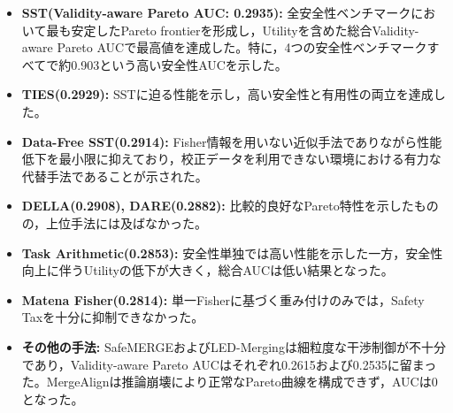 \documentclass{article}
\begin{document}
\begin{itemize}
    \item \textbf{SST(Validity-aware Pareto AUC: 0.2935):}
    全安全性ベンチマークにおいて最も安定したPareto frontierを形成し，Utilityを含めた総合Validity-aware Pareto AUCで最高値を達成した。特に，4つの安全性ベンチマークすべてで約0.903という高い安全性AUCを示した。
    \item \textbf{TIES(0.2929):}
    SSTに迫る性能を示し，高い安全性と有用性の両立を達成した。
    \item \textbf{Data-Free SST(0.2914):}
    Fisher情報を用いない近似手法でありながら性能低下を最小限に抑えており，校正データを利用できない環境における有力な代替手法であることが示された。
    \item \textbf{DELLA(0.2908), DARE(0.2882):}
    比較的良好なPareto特性を示したものの，上位手法には及ばなかった。
    \item \textbf{Task Arithmetic(0.2853):}
    安全性単独では高い性能を示した一方，安全性向上に伴うUtilityの低下が大きく，総合AUCは低い結果となった。
    \item \textbf{Matena Fisher(0.2814):}
    単一Fisherに基づく重み付けのみでは，Safety Taxを十分に抑制できなかった。
    \item \textbf{その他の手法:}
    SafeMERGEおよびLED-Mergingは細粒度な干渉制御が不十分であり，Validity-aware Pareto AUCはそれぞれ0.2615および0.2535に留まった。MergeAlignは推論崩壊により正常なPareto曲線を構成できず，AUCは0となった。
\end{itemize}
\end{document}
